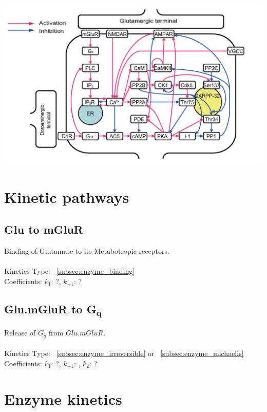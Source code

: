 \documentclass[twoside,twocolumn]{article}
\begin{document}
\begin{strip}
    \centering\noindent
    \includegraphics[width=\textwidth,natwidth=1132,natheight=701]{dopamine-kinetic-diagram.png}
\end{strip}

\section{Kinetic pathways}
\subsection{Glu to mGluR}
Binding of Glutamate to its Metabotropic receptors.
\\
\\Kinetics Type: ~\ref{subsec:enzyme_binding}
\\Coefficients: $k_{1}$: ?, $k_{-1}$: ? 

\subsection{Glu.mGluR to \texorpdfstring{G\textsubscript{q}}{Gq}}
Release of $G_{q}$ from $Glu.mGluR$.
\\
\\Kinetics Type: ~\ref{subsec:enzyme_irreversible} or ~\ref{subsec:enzyme_michaelis}
\\Coefficients: $k_{1}$: ?, $k_{-1}$: , $k_{2}$: ? 

\section{Enzyme kinetics}
\end{document}
